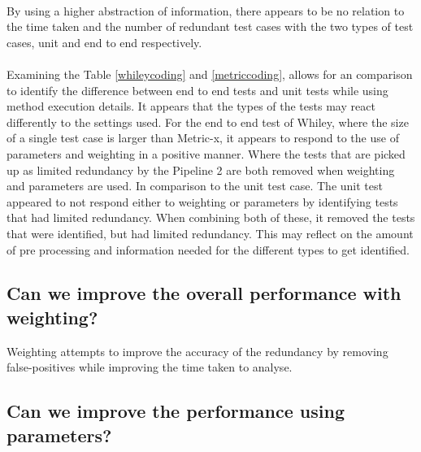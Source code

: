 \paragraph{}
By using a higher abstraction of information, there appears to be no relation to the time taken and the number of redundant test cases with the two types of test cases, unit and end to end respectively.
\paragraph{}
Examining the Table \ref{whileycoding} and \ref{metriccoding}, allows for an comparison to identify the difference between end to end tests and unit tests while using method execution details. It appears that the types of the tests may react differently to the settings used. For the end to end test of Whiley, where the size of a single test case is larger than Metric-x, it appears to respond to the use of parameters and weighting in a positive manner. Where the tests that are picked up as limited redundancy by the Pipeline 2 are both removed when weighting and parameters are used. In comparison to the unit test case. The unit test appeared to not respond either to weighting or parameters by identifying tests that had limited redundancy. When combining both of these, it removed the tests that were identified, but had limited redundancy.  This may reflect on the amount of pre processing and information needed for the different types to get identified. 


\subsection{Can we improve the overall performance with weighting?}
Weighting attempts to improve the accuracy of the redundancy by removing false-positives while improving the time taken to analyse. 


\subsection{Can we improve the performance using parameters?}

